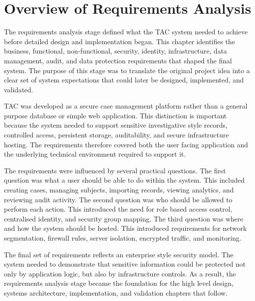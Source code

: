 \raggedright

\section{Overview of Requirements Analysis}

The requirements analysis stage defined what the TAC system needed to achieve before detailed design and implementation began. This chapter identifies the business, functional, non-functional, security, identity, infrastructure, data management, audit, and data protection requirements that shaped the final system. The purpose of this stage was to translate the original project idea into a clear set of system expectations that could later be designed, implemented, and validated.

TAC was developed as a secure case management platform rather than a general purpose database or simple web application. This distinction is important because the system needed to support sensitive investigative style records, controlled access, persistent storage, auditability, and secure infrastructure hosting. The requirements therefore covered both the user facing application and the underlying technical environment required to support it.

The requirements were influenced by several practical questions. The first question was what a user should be able to do within the system. This included creating cases, managing subjects, importing records, viewing analytics, and reviewing audit activity. The second question was who should be allowed to perform each action. This introduced the need for role based access control, centralised identity, and security group mapping. The third question was where and how the system should be hosted. This introduced requirements for network segmentation, firewall rules, server isolation, encrypted traffic, and monitoring.

The final set of requirements reflects an enterprise style security model. The system needed to demonstrate that sensitive information could be protected not only by application logic, but also by infrastructure controls. As a result, the requirements analysis stage became the foundation for the high level design, systems architecture, implementation, and validation chapters that follow.


